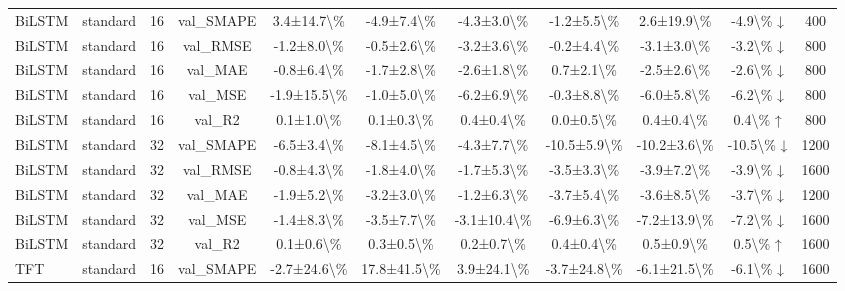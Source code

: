 \begin{table}
{\begin{tabular}{lllcccccccc}
BiLSTM & standard & 16 & val\_SMAPE & 3.4±14.7\textbackslash \% & -4.9±7.4\textbackslash \% & -4.3±3.0\textbackslash \% & -1.2±5.5\textbackslash \% & 2.6±19.9\textbackslash \% & -4.9\textbackslash \% ↓ & 400 \\
BiLSTM & standard & 16 & val\_RMSE & -1.2±8.0\textbackslash \% & -0.5±2.6\textbackslash \% & -3.2±3.6\textbackslash \% & -0.2±4.4\textbackslash \% & -3.1±3.0\textbackslash \% & -3.2\textbackslash \% ↓ & 800 \\
BiLSTM & standard & 16 & val\_MAE & -0.8±6.4\textbackslash \% & -1.7±2.8\textbackslash \% & -2.6±1.8\textbackslash \% & 0.7±2.1\textbackslash \% & -2.5±2.6\textbackslash \% & -2.6\textbackslash \% ↓ & 800 \\
BiLSTM & standard & 16 & val\_MSE & -1.9±15.5\textbackslash \% & -1.0±5.0\textbackslash \% & -6.2±6.9\textbackslash \% & -0.3±8.8\textbackslash \% & -6.0±5.8\textbackslash \% & -6.2\textbackslash \% ↓ & 800 \\
BiLSTM & standard & 16 & val\_R2 & 0.1±1.0\textbackslash \% & 0.1±0.3\textbackslash \% & 0.4±0.4\textbackslash \% & 0.0±0.5\textbackslash \% & 0.4±0.4\textbackslash \% & 0.4\textbackslash \% ↑ & 800 \\
BiLSTM & standard & 32 & val\_SMAPE & -6.5±3.4\textbackslash \% & -8.1±4.5\textbackslash \% & -4.3±7.7\textbackslash \% & -10.5±5.9\textbackslash \% & -10.2±3.6\textbackslash \% & -10.5\textbackslash \% ↓ & 1200 \\
BiLSTM & standard & 32 & val\_RMSE & -0.8±4.3\textbackslash \% & -1.8±4.0\textbackslash \% & -1.7±5.3\textbackslash \% & -3.5±3.3\textbackslash \% & -3.9±7.2\textbackslash \% & -3.9\textbackslash \% ↓ & 1600 \\
BiLSTM & standard & 32 & val\_MAE & -1.9±5.2\textbackslash \% & -3.2±3.0\textbackslash \% & -1.2±6.3\textbackslash \% & -3.7±5.4\textbackslash \% & -3.6±8.5\textbackslash \% & -3.7\textbackslash \% ↓ & 1200 \\
BiLSTM & standard & 32 & val\_MSE & -1.4±8.3\textbackslash \% & -3.5±7.7\textbackslash \% & -3.1±10.4\textbackslash \% & -6.9±6.3\textbackslash \% & -7.2±13.9\textbackslash \% & -7.2\textbackslash \% ↓ & 1600 \\
BiLSTM & standard & 32 & val\_R2 & 0.1±0.6\textbackslash \% & 0.3±0.5\textbackslash \% & 0.2±0.7\textbackslash \% & 0.4±0.4\textbackslash \% & 0.5±0.9\textbackslash \% & 0.5\textbackslash \% ↑ & 1600 \\
TFT & standard & 16 & val\_SMAPE & -2.7±24.6\textbackslash \% & 17.8±41.5\textbackslash \% & 3.9±24.1\textbackslash \% & -3.7±24.8\textbackslash \% & -6.1±21.5\textbackslash \% & -6.1\textbackslash \% ↓ & 1600 \\

\end{tabular}}
\end{table}
